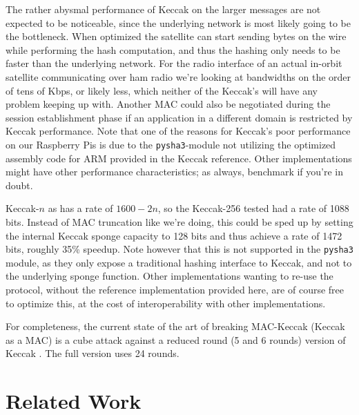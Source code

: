 The rather abysmal performance of Keccak on the larger messages are not expected to be noticeable, since the underlying network is most likely going to be the bottleneck. When optimized the satellite can start sending bytes on the wire while performing the hash computation, and thus the hashing only needs to be faster than the underlying network. For the radio interface of an actual in-orbit satellite communicating over ham radio we're looking at bandwidths on the order of tens of Kbps, or likely less, which neither of the Keccak's will have any problem keeping up with. Another MAC could also be negotiated during the session establishment phase if an application in a different domain is restricted by Keccak performance. Note that one of the reasons for Keccak's poor performance on our Raspberry Pis is due to the \texttt{pysha3}-module not utilizing the optimized assembly code for ARM provided in the Keccak reference. Other implementations might have other performance characteristics; as always, benchmark if you're in doubt.

Keccak-$n$ as has a rate of \(1600-2n\), so the Keccak-256 tested had a rate of 1088 bits. Instead of MAC truncation like we're doing, this could be sped up by setting the internal Keccak sponge capacity to 128 bits and thus achieve a rate of 1472 bits, roughly 35\%  speedup. Note however that this is not supported in the \texttt{pysha3} module, as they only expose a traditional hashing interface to Keccak, and not to the underlying sponge function. Other implementations wanting to re-use the protocol, without the reference implementation provided here, are of course free to optimize this, at the cost of interoperability with other implementations.

For completeness, the current state of the art of breaking MAC-Keccak (Keccak as a MAC) is a cube attack against a reduced round (5 and 6 rounds) version of Keccak \cite{keccak_cube_attack}. The full version uses 24 rounds.


\section{Related Work}\label{sec:related_work}

